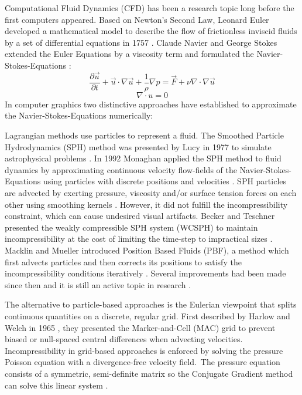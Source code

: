 Computational Fluid Dynamics (CFD) has been a research topic long before the first computers appeared. Based on Newton's Second Law, Leonard Euler developed a mathematical model to describe the flow of frictionless inviscid fluids by a set of differential equations in 1757 \parencite{euler1757principes}. Claude Navier and George Stokes extended the Euler Equations by a viscosity term and formulated the Navier-Stokes-Equations \parencite{navier1827memoire} \parencite{stokes1880theories}:
\[
    \frac{\partial \vec{u}}{\partial t} + \vec{u} \cdot \nabla \vec{u} + \frac{1}{\rho}  \nabla p = \vec{F} + \nu \nabla \cdot \nabla \vec{u}
\]
\[
    \nabla \cdot u = 0
\]
In computer graphics two distinctive approaches have established to approximate the Navier-Stokes-Equations numerically: 
\par Lagrangian methods use particles to represent a fluid. The Smoothed Particle Hydrodynamics (SPH) method was presented by Lucy in 1977 to simulate astrophysical problems \parencite{lucy1977numerical}. In 1992 Monaghan applied the SPH method to fluid dynamics by approximating continuous velocity flow-fields of the Navier-Stokes-Equations using particles with discrete positions and velocities \parencite{monaghan1992smoothed}. SPH particles are advected by exerting pressure, viscosity and/or surface tension forces on each other using smoothing kernels \parencite{muller2003particle}. However, it did not fulfill the incompressibility constraint, which can cause undesired visual artifacts. Becker and Teschner presented the weakly compressible SPH system (WCSPH) to maintain incompressibility at the cost of limiting the time-step to impractical sizes \parencite{becker2007weakly}. Macklin and Mueller introduced Position Based Fluids (PBF), a method which first advects particles and then corrects its positions to satisfy the incompressibility conditions iteratively \parencite{macklin2013position}. Several improvements had been made since then and it is still an active topic in research \parencite{morikawaimprovements}.
\par The alternative to particle-based approaches is the Eulerian viewpoint that splits continuous quantities on a discrete, regular grid. First described by Harlow and Welch in 1965 \parencite{harlow1965numerical}, they presented the Marker-and-Cell (MAC) grid to prevent biased or null-spaced central differences when advecting velocities. Incompressibility in grid-based approaches is enforced by solving the pressure Poisson equation with a divergence-free velocity field. The pressure equation consists of a symmetric, semi-definite matrix so the Conjugate Gradient method can solve this linear system \parencite{hestenes1952methods}.
